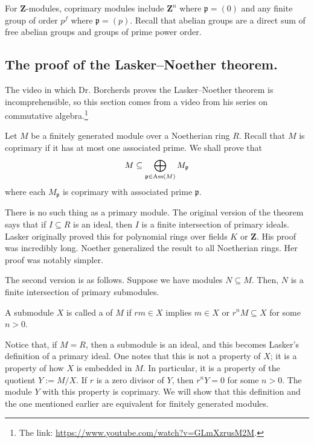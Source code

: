 \documentclass [11 pt, oneside] {article}
\begin{document}
For $\mathbf{Z}$-modules, coprimary modules include $\mathbf{Z}^n$ where $\mathfrak{p}=(0)$ and any finite group of order $p^f$ where $\mathfrak{p} = (p)$. Recall that abelian groups are a direct sum of free abelian groups and groups of prime power order.

\subsection{The proof of the Lasker--Noether theorem.}
The video in which Dr. Borcherds proves the Lasker--Noether theorem is incomprehensible, so this section comes from a video from his series on commutative algebra.\footnote{The link: \url{https://www.youtube.com/watch?v=GLmXzrusM2M}.}

Let $M$ be a finitely generated module over a Noetherian ring $R$. Recall that $M$ is coprimary if it has at most one associated prime. We shall prove that
\begin{align*}
	M \subseteq \bigoplus_{\mathfrak{p}\in \operatorname{Ass} (M)} M_{\mathfrak{p}}
\end{align*}
where each $M_{\mathfrak{p}}$ is coprimary with associated prime $ \mathfrak{p}$. 

There is no such thing as a primary module. The original version of the theorem says that if $I\subseteq R$ is an ideal, then $I$ is a finite intersection of primary ideals. Lasker originally proved this for polynomial rings over fields $K$ or $\mathbf{Z}$. His proof was incredibly long. Noether generalized the result to all Noetherian rings. Her proof was notably simpler.

The second version is as follows. Suppose we have modules $N\subseteq M$. Then, $N$ is a finite intersection of primary submodules.

\begin{definition}[ ]\label{}
A submodule $X$ is called a  of $M$ if $rm\in X$ implies $m\in X$ or $r^nM\subseteq X$ for some $n>0$.
\end{definition}

Notice that, if $M=R$, then a submodule is an ideal, and this becomes Lasker's definition of a primary ideal. One notes that this is not a property of $X$; it is a property of how $X$ is embedded in $M$. In particular, it is a property of the quotient $Y:= M/X$. If $r$ is a zero divisor of $Y$, then $r^nY=0$ for some $n>0$. The module $Y$ with this property is coprimary. We will show that this definition and the one mentioned earlier are equivalent for finitely generated modules.
\end{document}
